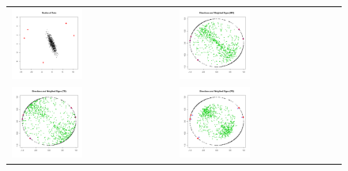 \begin{figure}[t]
\begin{center}
\begin{tabular}{ll}
\includegraphics[width=0.45\textwidth]{./Plots_SC/WeightedSign_Scatter_700_02_27_19} &
\includegraphics[width=0.45\textwidth]{./Plots_SC/WeightedSign_MD_700_02_27_19} \\
\includegraphics[width=0.45\textwidth]{./Plots_SC/WeightedSign_TD_700_02_27_19} &
\includegraphics[width=0.45\textwidth]{./Plots_SC/WeightedSign_PD_700_02_27_19} \\


\end{tabular}
\end{center}
\end{figure}
